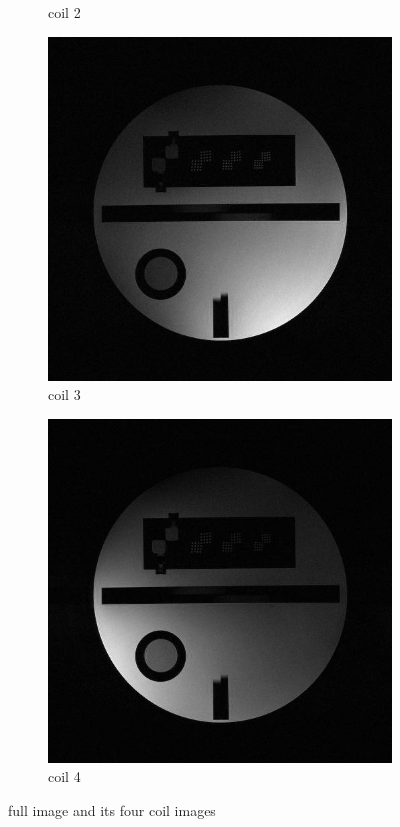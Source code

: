 \documentclass[UTF8]{article}
\begin{document}
\begin{figure}[ht]
\begin{subfigure}[t]{0.15\textwidth}
		\caption{coil 2 }
		\label{fig:1c}
	\end{subfigure}
	\begin{subfigure}[t]{0.15\textwidth}
		\centering
		\includegraphics[width=\textwidth]{./image/3coil.jpg}
		\caption{coil 3 }
		\label{fig:1d}
	\end{subfigure}
	\begin{subfigure}[t]{0.15\textwidth}
		\centering
		\includegraphics[width=\textwidth]{./image/4coil.jpg}
		\caption{coil 4 }
		\label{fig:1e}
	\end{subfigure}
	\caption{full image and its four coil images}
	\label{images}
\end{figure}
\end{document}
